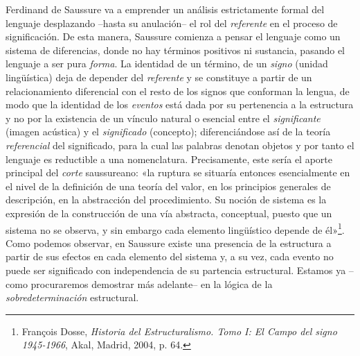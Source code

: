 Ferdinand de Saussure va a emprender un análisis estrictamente formal del lenguaje desplazando --hasta su anulación-- el rol del \emph{referente} en el proceso de significación. De esta manera, Saussure comienza a pensar el lenguaje como un sistema de diferencias, donde no hay términos positivos ni sustancia, pasando el lenguaje a ser pura \emph{forma}. La identidad de un término, de un \emph{signo} (unidad lingüística) deja de depender del \emph{referente} y se constituye a partir de un relacionamiento diferencial con el resto de los signos que conforman la lengua, de modo que la identidad de los \emph{eventos} está dada por su pertenencia a la estructura y no por la existencia de un vínculo natural o esencial entre el \emph{significante} (imagen acústica) y el \emph{significado} (concepto); diferenciándose así de la teoría \emph{referencial} del significado, para la cual las palabras denotan objetos y por tanto el lenguaje es reductible a una nomenclatura. Precisamente, este sería el aporte principal del \emph{corte} saussureano: «la ruptura se situaría entonces esencialmente en el nivel de la definición de una teoría del valor, en los principios generales de descripción, en la abstracción del procedimiento. Su noción de sistema es la expresión de la construcción de una vía abstracta, conceptual, puesto que un sistema no se observa, y sin embargo cada elemento lingüístico depende de él»\footnote{François Dosse, \emph{Historia del Estructuralismo. Tomo I: El Campo del signo 1945-1966}, Akal, Madrid, 2004, p. 64.}. Como podemos observar, en Saussure existe una presencia de la estructura a partir de sus efectos en cada elemento del sistema y, a su vez, cada evento no puede ser significado con independencia de su partencia estructural. Estamos ya --como procuraremos demostrar más adelante-- en la lógica de la \emph{sobredeterminación} estructural.

